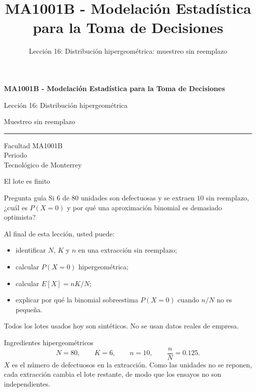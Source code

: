 \documentclass[aspectratio=169,10pt,spanish]{beamer}
\title{MA1001B - Modelación Estadística para la Toma de Decisiones}
\subtitle{Lección 16: Distribución hipergeométrica: muestreo sin reemplazo}
\author{}
\institute{Tecnol\'ogico de Monterrey}
\date{}
\begin{document}
\begin{frame}[plain]
  \vspace{0.9cm}
  {\Large\bfseries MA1001B - Modelación Estadística para la Toma de Decisiones\par}
  \vspace{0.5cm}
  {\large Lección 16: Distribución hipergeométrica\par}
  \vspace{0.1cm}
  {\large Muestreo sin reemplazo\par}
  \vspace{0.5cm}
  {\color{TecRojo}\rule{\textwidth}{1.2pt}}
  \vspace{0.6cm}

  Facultad MA1001B\\[0.3cm]
  Periodo\\[0.3cm]
  Tecnol\'ogico de Monterrey
\end{frame}

\begin{frame}{El lote es finito}
  \begin{alertblock}{Pregunta guía}
    Si $6$ de $80$ unidades son defectuosas y se extraen $10$ sin reemplazo,
    ¿cuál es $P(X=0)$ y por qué una aproximación binomial es demasiado
    optimista?
  \end{alertblock}

  \vspace{0.6em}
  Al final de esta lección, usted puede:
  \begin{itemize}
    \item identificar $N$, $K$ y $n$ en una extracción sin reemplazo;
    \item calcular $P(X=0)$ hipergeométrica;
    \item calcular $E[X]=nK/N$;
    \item explicar por qué la binomial sobreestima $P(X=0)$ cuando $n/N$ no es pequeña.
  \end{itemize}

  \vfill
  \scriptsize Todos los lotes usados hoy son sintéticos. No se usan datos reales de empresa.
\end{frame}

\begin{frame}{Ingredientes hipergeométricos}
  \small
  \[
    N=80,\qquad K=6,\qquad n=10,\qquad \frac{n}{N}=0.125.
  \]
  $X$ es el número de defectuosos en la extracción. Como las unidades no se
  reponen, cada extracción cambia el lote restante, de modo que los ensayos
  no son independientes.
\end{frame}
\end{document}
